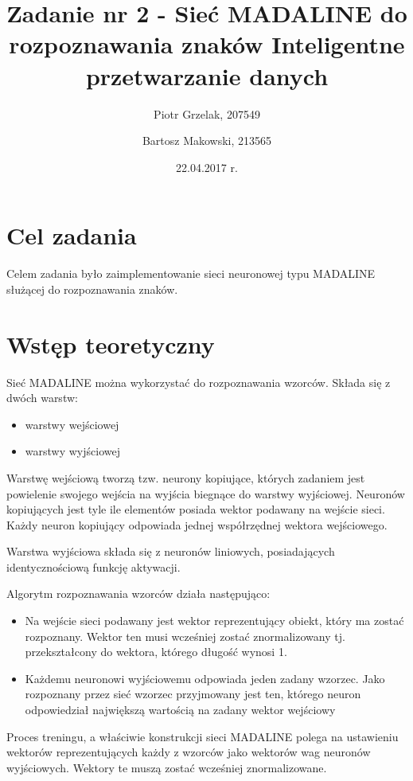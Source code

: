 \documentclass[12pt]{article}
\title{{\bf Zadanie nr 2 - Sieć MADALINE do rozpoznawania znaków}\linebreak
Inteligentne przetwarzanie danych}
\author{Piotr Grzelak, 207549 \and Bartosz Makowski, 213565}
\date{22.04.2017 r.}
\begin{document}
\clearpage\maketitle
\thispagestyle{empty}
\newpage
\setcounter{page}{1}
\section{Cel zadania}

Celem zadania było zaimplementowanie sieci neuronowej typu MADALINE służącej do rozpoznawania znaków.

\section{Wstęp teoretyczny}

Sieć MADALINE można wykorzystać do rozpoznawania wzorców. Składa się z dwóch warstw:
\begin{itemize}
\item warstwy wejściowej
\item warstwy wyjściowej
\end{itemize}

Warstwę wejściową tworzą tzw. neurony kopiujące, których zadaniem jest powielenie swojego wejścia na wyjścia biegnące do warstwy wyjściowej. Neuronów kopiujących jest tyle ile elementów posiada wektor podawany na wejście sieci. Każdy neuron kopiujący odpowiada jednej współrzędnej wektora wejściowego.

Warstwa wyjściowa składa się z neuronów liniowych, posiadających identycznościową funkcję aktywacji.

Algorytm rozpoznawania wzorców działa następująco:
\begin{itemize}
\item Na wejście sieci podawany jest wektor reprezentujący obiekt, który ma zostać rozpoznany. Wektor ten musi wcześniej zostać znormalizowany tj. przekształcony do wektora, którego długość wynosi 1.
\item Każdemu neuronowi wyjściowemu odpowiada jeden zadany wzorzec. Jako rozpoznany przez sieć wzorzec przyjmowany jest ten, którego neuron odpowiedział największą wartością na zadany wektor wejściowy
\end{itemize}

Proces treningu, a właściwie konstrukcji sieci MADALINE polega na ustawieniu wektorów reprezentujących każdy z wzorców jako wektorów wag neuronów wyjściowych. Wektory te muszą zostać wcześniej znormalizowane.
\end{document}
